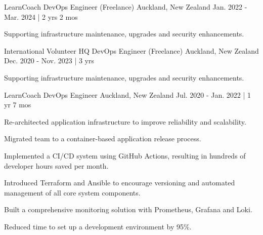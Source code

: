 \begin{cventries}

\cventry
{LearnCoach} %
{DevOps Engineer (Freelance)} %
{Auckland, New Zealand} %
{Jan. 2022 - Mar. 2024 | 2 yrs 2 mos} %
{ %
\begin{cvitems}
\item {Supporting infrastructure maintenance, upgrades and security enhancements.}
\end{cvitems}
}


\cventry
{International Volunteer HQ} %
{DevOps Engineer (Freelance)} %
{Auckland, New Zealand} %
{Dec. 2020 - Nov. 2023 | 3 yrs} %
{ %
\begin{cvitems}
\item {Supporting infrastructure maintenance, upgrades and security enhancements.}
\end{cvitems}
}


\cventry
{LearnCoach} %
{DevOps Engineer} %
{Auckland, New Zealand} %
{Jul. 2020 - Jan. 2022 | 1 yr 7 mos} %
{ %
\begin{cvitems}
\item {Re-architected application infrastructure to improve reliability and scalability.}
\item {Migrated team to a container-based application release process.}
\item {Implemented a CI/CD system using GitHub Actions, resulting in hundreds of developer hours saved per month.}
\item {Introduced Terraform and Ansible to encourage versioning and automated management of all core system components.}
\item {Built a comprehensive monitoring solution with Prometheus, Grafana and Loki.}
\item {Reduced time to set up a development environment by 95\%.}
\end{cvitems}
}



\end{cventries}
